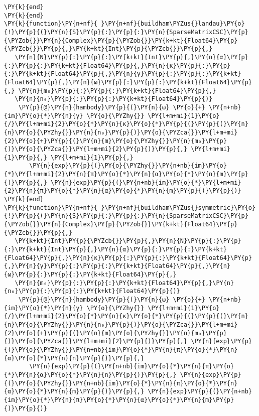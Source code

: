 \begin{Verbatim}[commandchars=\\\{\}]
    \PY{k}{end}
\PY{k}{end}
\PY{k}{function}\PY{n+nf}{ }\PY{n+nf}{buildham\PYZus{}landau}\PY{o}{!}\PY{p}{(}\PY{n}{S}\PY{p}{:}\PY{p}{:}\PY{n}{SparseMatrixCSC}\PY{p}{\PYZob{}}\PY{n}{Complex}\PY{p}{\PYZob{}}\PY{k+kt}{Float64}\PY{p}{\PYZcb{}}\PY{p}{,}\PY{k+kt}{Int}\PY{p}{\PYZcb{}}\PY{p}{,}
   \PY{n}{N}\PY{p}{:}\PY{p}{:}\PY{k+kt}{Int}\PY{p}{,}\PY{n}{α}\PY{p}{:}\PY{p}{:}\PY{k+kt}{Float64}\PY{p}{,}\PY{n}{κ}\PY{p}{:}\PY{p}{:}\PY{k+kt}{Float64}\PY{p}{,}\PY{n}{γ}\PY{p}{:}\PY{p}{:}\PY{k+kt}{Float64}\PY{p}{,}\PY{n}{ω}\PY{p}{:}\PY{p}{:}\PY{k+kt}{Float64}\PY{p}{,} \PY{n}{m₀}\PY{p}{:}\PY{p}{:}\PY{k+kt}{Float64}\PY{p}{,}
   \PY{n}{n₀}\PY{p}{:}\PY{p}{:}\PY{k+kt}{Float64}\PY{p}{)}
    \PY{p}{@}\PY{n}{hambody}\PY{p}{(}\PY{n}{ω} \PY{o}{+} \PY{n+nb}{im}\PY{o}{*}\PY{n}{γ} \PY{o}{\PYZhy{}} \PY{l+m+mi}{1}\PY{o}{/}\PY{l+m+mi}{2}\PY{o}{*}\PY{n}{κ}\PY{o}{*}\PY{p}{(}\PY{p}{(}\PY{n}{n}\PY{o}{\PYZhy{}}\PY{n}{n₀}\PY{p}{)}\PY{o}{\PYZca{}}\PY{l+m+mi}{2}\PY{o}{+}\PY{p}{(}\PY{n}{m}\PY{o}{\PYZhy{}}\PY{n}{m₀}\PY{p}{)}\PY{o}{\PYZca{}}\PY{l+m+mi}{2}\PY{p}{)}\PY{p}{,} \PY{l+m+mi}{1}\PY{p}{,} \PY{l+m+mi}{1}\PY{p}{,}
       \PY{n}{exp}\PY{p}{(}\PY{o}{\PYZhy{}}\PY{n+nb}{im}\PY{o}{*}\PY{l+m+mi}{2}\PY{n}{π}\PY{o}{*}\PY{n}{α}\PY{o}{*}\PY{n}{m}\PY{p}{)}\PY{p}{,} \PY{n}{exp}\PY{p}{(}\PY{n+nb}{im}\PY{o}{*}\PY{l+m+mi}{2}\PY{n}{π}\PY{o}{*}\PY{n}{α}\PY{o}{*}\PY{n}{m}\PY{p}{)}\PY{p}{)}
\PY{k}{end}
\PY{k}{function}\PY{n+nf}{ }\PY{n+nf}{buildham\PYZus{}symmetric}\PY{o}{!}\PY{p}{(}\PY{n}{S}\PY{p}{:}\PY{p}{:}\PY{n}{SparseMatrixCSC}\PY{p}{\PYZob{}}\PY{n}{Complex}\PY{p}{\PYZob{}}\PY{k+kt}{Float64}\PY{p}{\PYZcb{}}\PY{p}{,}
   \PY{k+kt}{Int}\PY{p}{\PYZcb{}}\PY{p}{,}\PY{n}{N}\PY{p}{:}\PY{p}{:}\PY{k+kt}{Int}\PY{p}{,}\PY{n}{α}\PY{p}{:}\PY{p}{:}\PY{k+kt}{Float64}\PY{p}{,}\PY{n}{κ}\PY{p}{:}\PY{p}{:}\PY{k+kt}{Float64}\PY{p}{,}\PY{n}{γ}\PY{p}{:}\PY{p}{:}\PY{k+kt}{Float64}\PY{p}{,}\PY{n}{ω}\PY{p}{:}\PY{p}{:}\PY{k+kt}{Float64}\PY{p}{,}
   \PY{n}{m₀}\PY{p}{:}\PY{p}{:}\PY{k+kt}{Float64}\PY{p}{,}\PY{n}{n₀}\PY{p}{:}\PY{p}{:}\PY{k+kt}{Float64}\PY{p}{)}
    \PY{p}{@}\PY{n}{hambody}\PY{p}{(}\PY{n}{ω} \PY{o}{+} \PY{n+nb}{im}\PY{o}{*}\PY{n}{γ} \PY{o}{\PYZhy{}} \PY{l+m+mi}{1}\PY{o}{/}\PY{l+m+mi}{2}\PY{o}{*}\PY{n}{κ}\PY{o}{*}\PY{p}{(}\PY{p}{(}\PY{n}{n}\PY{o}{\PYZhy{}}\PY{n}{n₀}\PY{p}{)}\PY{o}{\PYZca{}}\PY{l+m+mi}{2}\PY{o}{+}\PY{p}{(}\PY{n}{m}\PY{o}{\PYZhy{}}\PY{n}{m₀}\PY{p}{)}\PY{o}{\PYZca{}}\PY{l+m+mi}{2}\PY{p}{)}\PY{p}{,} \PY{n}{exp}\PY{p}{(}\PY{o}{\PYZhy{}}\PY{n+nb}{im}\PY{o}{*}\PY{n}{π}\PY{o}{*}\PY{n}{α}\PY{o}{*}\PY{n}{n}\PY{p}{)}\PY{p}{,}
       \PY{n}{exp}\PY{p}{(}\PY{n+nb}{im}\PY{o}{*}\PY{n}{π}\PY{o}{*}\PY{n}{α}\PY{o}{*}\PY{n}{n}\PY{p}{)}\PY{p}{,} \PY{n}{exp}\PY{p}{(}\PY{o}{\PYZhy{}}\PY{n+nb}{im}\PY{o}{*}\PY{n}{π}\PY{o}{*}\PY{n}{α}\PY{o}{*}\PY{n}{m}\PY{p}{)}\PY{p}{,} \PY{n}{exp}\PY{p}{(}\PY{n+nb}{im}\PY{o}{*}\PY{n}{π}\PY{o}{*}\PY{n}{α}\PY{o}{*}\PY{n}{m}\PY{p}{)}\PY{p}{)}

\end{Verbatim}
